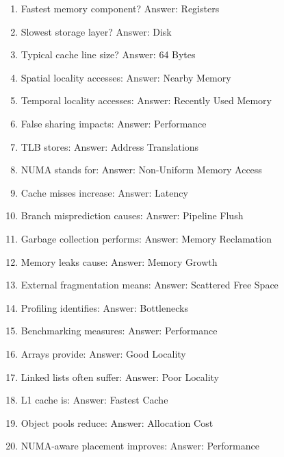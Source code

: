 \begin{enumerate}
\item Fastest memory component?
Answer: Registers

\item Slowest storage layer?
Answer: Disk

\item Typical cache line size?
Answer: 64 Bytes

\item Spatial locality accesses:
Answer: Nearby Memory

\item Temporal locality accesses:
Answer: Recently Used Memory

\item False sharing impacts:
Answer: Performance

\item TLB stores:
Answer: Address Translations

\item NUMA stands for:
Answer: Non-Uniform Memory Access

\item Cache misses increase:
Answer: Latency

\item Branch misprediction causes:
Answer: Pipeline Flush

\item Garbage collection performs:
Answer: Memory Reclamation

\item Memory leaks cause:
Answer: Memory Growth

\item External fragmentation means:
Answer: Scattered Free Space

\item Profiling identifies:
Answer: Bottlenecks

\item Benchmarking measures:
Answer: Performance

\item Arrays provide:
Answer: Good Locality

\item Linked lists often suffer:
Answer: Poor Locality

\item L1 cache is:
Answer: Fastest Cache

\item Object pools reduce:
Answer: Allocation Cost

\item NUMA-aware placement improves:
Answer: Performance
\end{enumerate}

